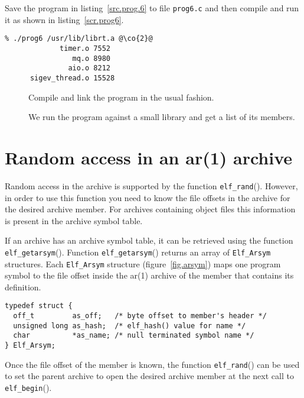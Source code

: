 \documentclass[a4paper]{book}
\makeatletter
\newcommand{\function}[1]{\texttt{#1}()}
\newcommand{\filename}[1]{\texttt{#1}}
\newcommand{\type}[1]{\texttt{#1}}
\newenvironment{callout}[2][blue]{%
  \begingroup\newcommand{\@cocolor}{#1}%
  \newcommand{\@cogroup}[1]{#2}}{\endgroup}
\newcommand{\@co}[1]{\framebox{\textbf{\color{\@cocolor}#1}}}
\newcommand{\co}[1]{%
  \hypertarget{\@cogroup.#1.co}{%
    \hyperlink{\@cogroup.#1.cr}{\@co{#1}}}}
\newcommand{\coref}[1]{%
  \hypertarget{\@cogroup.#1.cr}{%
    \hyperlink{\@cogroup.#1.co}{\@co{#1}}}}
\makeatother
\begin{document}
Save the program in listing~\vref{src.prog.6} to file
\filename{prog6.c} and then compile and run it as shown in
listing~\vref{scr.prog6}.

\begin{callout}[red]{scr6}
  \begin{lstlisting}[language={}, basicstyle=\small\ttfamily,
      label=scr.prog6, caption=Compiling and Running prog6]
% cc -o prog6 prog6.c -lelf @\co{1}@
% ./prog6 /usr/lib/librt.a @\co{2}@
             timer.o 7552
                mq.o 8980
               aio.o 8212
      sigev_thread.o 15528
  \end{lstlisting}
  \begin{description}
  \item[\coref{1}] Compile and link the program in the usual fashion.
  \item[\coref{2}] We run the program against a small library and get
    a list of its members.
  \end{description}
\end{callout}

\section{Random access in an ar(1) archive}

Random access in the archive is supported by the function
\function{elf\_rand}.  However, in order to use this function you need
to know the file offsets in the archive for the desired archive
member.  For archives containing object files this information is
present in the archive symbol table.

If an archive has an archive symbol table, it can be retrieved using
the function \function{elf\_getarsym}.  Function
\function{elf\_getarsym} returns an array of \type{Elf\_Arsym}
structures.  Each \type{Elf\_Arsym} structure
(figure~\vref{fig.arsym}) maps one program symbol to the file offset
inside the ar(1) archive of the member that contains its
definition.

\begin{lstlisting}[caption=The \type{Elf\_Arsym} structure,
    label=fig.arsym, basicstyle=\small]
typedef struct {
  off_t         as_off;   /* byte offset to member's header */
  unsigned long as_hash;  /* elf_hash() value for name */
  char          *as_name; /* null terminated symbol name */
} Elf_Arsym;
\end{lstlisting}

Once the file offset of the member is known, the function
\function{elf\_rand} can be used to set the parent archive to open the
desired archive member at the next call to \function{elf\_begin}.
\end{document}
